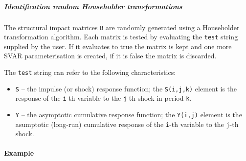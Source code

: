 \subparagraph{Identification random Householder
transformations}\label{identification-random-householder-transformations}

The structural impact matrices \texttt{B} are randomly generated using a
Householder transformation algorithm. Each matrix is tested by
evaluating the \texttt{test} string supplied by the user. If it
evaluates to true the matrix is kept and one more SVAR parameterisation
is created, if it is false the matrix is discarded.

The \texttt{test} string can refer to the following characteristics:

\begin{itemize}
\item
  \texttt{S} -- the impulse (or shock) response function; the
  \texttt{S(i,j,k)} element is the response of the \texttt{i}-th
  variable to the \texttt{j}-th shock in period \texttt{k}.
\item
  \texttt{Y} -- the asymptotic cumulative response function; the
  \texttt{Y(i,j)} element is the asumptotic (long-run) cumulative
  response of the \texttt{i}-th variable to the \texttt{j}-th shock.
\end{itemize}

\paragraph{Example}\label{example}


